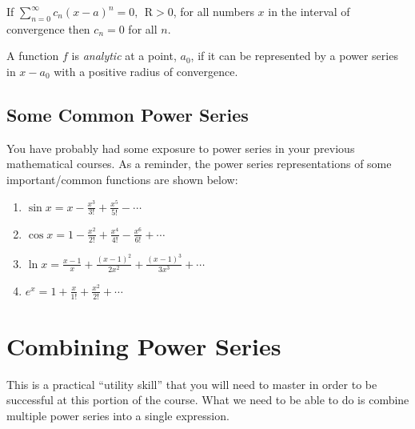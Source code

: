 \begin{definition}
If $\sum_{n=0}^{\infty}c_n(x-a)^n=0, \ \ \text{R}>0$, for all numbers $x$ in the interval of convergence then $c_n=0$ for all $n$.
\label{def:ps-identity-property}
\end{definition}


\begin{definition}
A function $f$ is \emph{analytic} at a point, $a_0$, if it can be represented by a power series in $x-a_0$ with a positive radius of convergence.
\end{definition}

\subsection{Some Common Power Series}
You have probably had some exposure to power series in your previous mathematical courses.  As a reminder, the power series representations of some important/common functions are shown below:

\begin{enumerate}

\item $\sin{x} = x - \frac{x^3}{3!} + \frac{x^5}{5!} - \cdots$

\item $\cos{x} = 1 - \frac{x^2}{2!} + \frac{x^4}{4!} - \frac{x^6}{6!} + \cdots$

\item $\ln{x} = \frac{x-1}{x} + \frac{(x-1)^2}{2x^2} + \frac{(x-1)^3}{3x^3} + \cdots$ 

\item $e^x = 1 + \frac{x}{1!} + \frac{x^2}{2!} + \cdots$
\end{enumerate}


\section{Combining Power Series}
This is a practical ``utility skill'' that you will need to master in order to be successful at this portion of the course.  What we need to be able to do is combine multiple power series into a single expression.  

